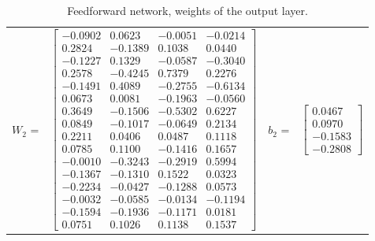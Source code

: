\documentclass[algorithms,article,submit,pdftex,moreauthors]{Definitions/mdpi}
\begin{document}
\begin{table}[ht]
	\centering
	\caption{Feedforward network, weights of the output layer.}
	\label{tab:matW2b2}
	
	\begin{tabular}{rlrl}  
		$W_2$ = & 
		$
	\begin{bmatrix}
-0.0902 &  0.0623 & -0.0051 & -0.0214 \\
 0.2824 & -0.1389 &  0.1038 &  0.0440 \\
-0.1227 &  0.1329 & -0.0587 & -0.3040 \\
 0.2578 & -0.4245 &  0.7379 &  0.2276 \\
-0.1491 &  0.4089 & -0.2755 & -0.6134 \\
 0.0673 &  0.0081 & -0.1963 & -0.0560 \\
 0.3649 & -0.1506 & -0.5302 &  0.6227 \\
 0.0849 & -0.1017 & -0.0649 &  0.2134 \\
 0.2211 &  0.0406 &  0.0487 &  0.1118 \\
 0.0785 &  0.1100 & -0.1416 &  0.1657 \\
-0.0010 & -0.3243 & -0.2919 &  0.5994 \\
-0.1367 & -0.1310 &  0.1522 &  0.0323 \\
-0.2234 & -0.0427 & -0.1288 &  0.0573 \\
-0.0032 & -0.0585 & -0.0134 & -0.1194 \\
-0.1594 & -0.1936 & -0.1171 &  0.0181 \\
 0.0751 &  0.1026 &  0.1138 &  0.1537
\end{bmatrix}
		$
		&
		$b_2$ = &
		$
		\begin{bmatrix}
			0.0467 \\  0.0970 \\ -0.1583 \\ -0.2808
		\end{bmatrix}
		$
	\end{tabular}	
\end{table}



\end{document}
